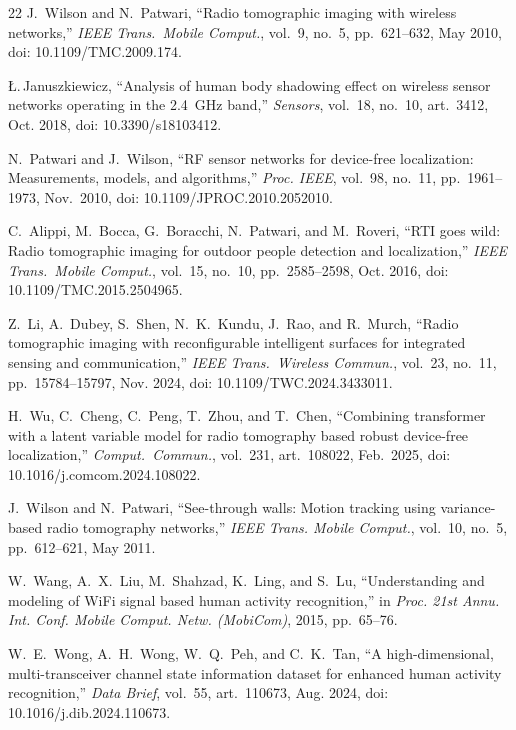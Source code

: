 \documentclass[journal,10pt]{IEEEtran}
\begin{document}
\begin{thebibliography}{22}
\setlength{\itemsep}{0pt}
 J.~Wilson and N.~Patwari, ``Radio tomographic imaging with
wireless networks,'' \emph{IEEE Trans.\ Mobile Comput.}, vol.~9, no.~5,
pp.~621--632, May 2010, doi: 10.1109/TMC.2009.174.

 {\L}.\,Januszkiewicz, ``Analysis of human body
shadowing effect on wireless sensor networks operating in the 2.4~GHz band,''
\emph{Sensors}, vol.~18, no.~10, art.~3412, Oct. 2018, doi:
10.3390/s18103412.

 N.~Patwari and J.~Wilson, ``RF sensor networks for device-free localization: Measurements, models, and algorithms,'' \emph{Proc. IEEE}, vol.~98, no.~11, pp.~1961--1973, Nov.~2010, doi: 10.1109/JPROC.2010.2052010.

 C.~Alippi, M.~Bocca, G.~Boracchi, N.~Patwari, and
M.~Roveri, ``RTI goes wild: Radio tomographic imaging for outdoor people
detection and localization,'' \emph{IEEE Trans.\ Mobile Comput.}, vol.~15,
no.~10, pp.~2585--2598, Oct. 2016, doi: 10.1109/TMC.2015.2504965.

 Z.~Li, A.~Dubey, S.~Shen, N.~K.~Kundu, J.~Rao, and R.~Murch,
``Radio tomographic imaging with reconfigurable intelligent surfaces for
integrated sensing and communication,'' \emph{IEEE Trans.\ Wireless Commun.},
vol.~23, no.~11, pp.~15784--15797, Nov. 2024, doi: 10.1109/TWC.2024.3433011.

 H.~Wu, C.~Cheng, C.~Peng, T.~Zhou, and T.~Chen, ``Combining
transformer with a latent variable model for radio tomography based robust
device-free localization,'' \emph{Comput.\ Commun.}, vol.~231, art.~108022,
Feb.~2025, doi: 10.1016/j.comcom.2024.108022.

 J.~Wilson and N.~Patwari, ``See-through walls: Motion tracking using variance-based radio tomography networks,'' \emph{IEEE Trans. Mobile Comput.}, vol.~10, no.~5, pp.~612--621, May 2011.

 W.~Wang, A.~X.~Liu, M.~Shahzad, K.~Ling, and S.~Lu, ``Understanding and modeling of WiFi signal based human activity recognition,'' in \emph{Proc. 21st Annu. Int. Conf. Mobile Comput. Netw. (MobiCom)}, 2015, pp.~65--76.

 W.~E.~Wong, A.~H.~Wong, W.~Q.~Peh, and C.~K.~Tan, ``A
high-dimensional, multi-transceiver channel state information dataset for
enhanced human activity recognition,'' \emph{Data Brief}, vol.~55,
art.~110673, Aug. 2024, doi: 10.1016/j.dib.2024.110673.


\end{thebibliography}
\end{document}
